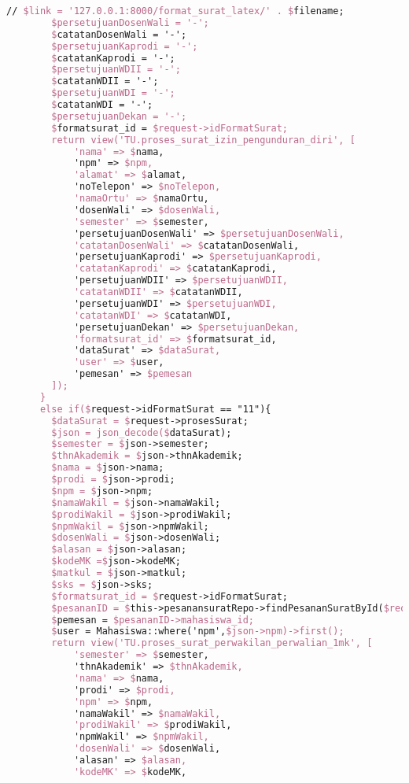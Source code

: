 \begin{lstlisting}[language=tex,basicstyle=\tiny,caption=PesanansuratController.php]
        // $link = '127.0.0.1:8000/format_surat_latex/' . $filename;
        $persetujuanDosenWali = '-';
        $catatanDosenWali = '-';
        $persetujuanKaprodi = '-';
        $catatanKaprodi = '-';
        $persetujuanWDII = '-';
        $catatanWDII = '-';
        $persetujuanWDI = '-';
        $catatanWDI = '-';
        $persetujuanDekan = '-';
        $formatsurat_id = $request->idFormatSurat;
        return view('TU.proses_surat_izin_pengunduran_diri', [
            'nama' => $nama,
            'npm' => $npm,
            'alamat' => $alamat,
            'noTelepon' => $noTelepon,
            'namaOrtu' => $namaOrtu,
            'dosenWali' => $dosenWali,
            'semester' => $semester,
            'persetujuanDosenWali' => $persetujuanDosenWali,
            'catatanDosenWali' => $catatanDosenWali,
            'persetujuanKaprodi' => $persetujuanKaprodi,
            'catatanKaprodi' => $catatanKaprodi,
            'persetujuanWDII' => $persetujuanWDII,
            'catatanWDII' => $catatanWDII,
            'persetujuanWDI' => $persetujuanWDI,
            'catatanWDI' => $catatanWDI,
            'persetujuanDekan' => $persetujuanDekan,
            'formatsurat_id' => $formatsurat_id,
            'dataSurat' => $dataSurat,
            'user' => $user,
            'pemesan' => $pemesan
        ]);
      }
      else if($request->idFormatSurat == "11"){
        $dataSurat = $request->prosesSurat;
        $json = json_decode($dataSurat);
        $semester = $json->semester;
        $thnAkademik = $json->thnAkademik;
        $nama = $json->nama;
        $prodi = $json->prodi;
        $npm = $json->npm;
        $namaWakil = $json->namaWakil;
        $prodiWakil = $json->prodiWakil;
        $npmWakil = $json->npmWakil;
        $dosenWali = $json->dosenWali;
        $alasan = $json->alasan;
        $kodeMK =$json->kodeMK;
        $matkul = $json->matkul;
        $sks = $json->sks;
        $formatsurat_id = $request->idFormatSurat;
        $pesananID = $this->pesanansuratRepo->findPesananSuratById($request->id);
        $pemesan = $pesananID->mahasiswa_id;
        $user = Mahasiswa::where('npm',$json->npm)->first();
        return view('TU.proses_surat_perwakilan_perwalian_1mk', [
            'semester' => $semester,
            'thnAkademik' => $thnAkademik,
            'nama' => $nama,
            'prodi' => $prodi,
            'npm' => $npm,
            'namaWakil' => $namaWakil,
            'prodiWakil' => $prodiWakil,
            'npmWakil' => $npmWakil,
            'dosenWali' => $dosenWali,
            'alasan' => $alasan,
            'kodeMK' => $kodeMK,

\end{lstlisting}
